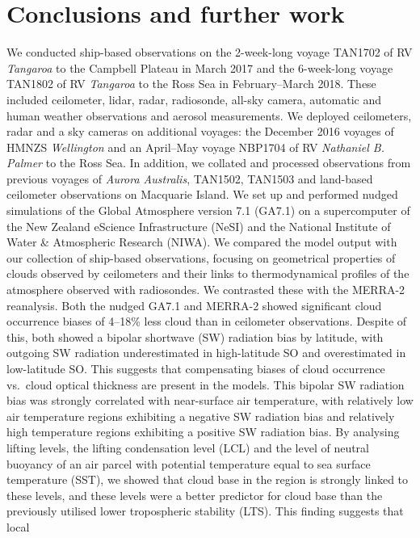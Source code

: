 \chapter{Conclusions and further work}

We conducted ship-based observations on the 2-week-long voyage TAN1702 of
RV \textit{Tangaroa} to the Campbell Plateau
in March 2017 and the 6-week-long voyage TAN1802 of RV \textit{Tangaroa} to the Ross Sea
in February--March 2018. These included ceilometer, lidar, radar, radiosonde,
all-sky camera, automatic and human weather observations and aerosol measurements.
We deployed ceilometers, radar and a sky cameras on additional voyages:
the December 2016 voyages of HMNZS \textit{Wellington} and an 
April--May voyage NBP1704 of RV \textit{Nathaniel B. Palmer} to the Ross Sea.
In addition, we collated and processed observations from previous voyages
of \textit{Aurora Australis}, TAN1502, TAN1503 and land-based ceilometer
observations on Macquarie Island.
We set up and performed nudged simulations
of the Global Atmosphere version 7.1 (GA7.1) on a supercomputer of the New Zealand eScience Infrastructure (NeSI) and the National Institute of Water \& Atmospheric Research (NIWA).
We compared the model output with our collection of ship-based observations,
focusing on geometrical properties of clouds observed by ceilometers and their
links to thermodynamical profiles of the atmosphere observed with radiosondes.
We contrasted these with the MERRA-2 reanalysis. Both the nudged GA7.1 and MERRA-2
showed significant cloud occurrence biases of 4--18\% less cloud than in
ceilometer observations. Despite of this, both showed a bipolar shortwave (SW)
radiation
bias by latitude, with outgoing SW radiation underestimated in high-latitude
SO and overestimated in low-latitude SO. This suggests that compensating biases
of cloud occurrence vs.~cloud optical thickness are present in the models.
This bipolar SW radiation bias was strongly correlated with near-surface air temperature,
with relatively low air temperature regions exhibiting a negative SW radiation bias and
relatively high temperature regions exhibiting a positive SW radiation bias. By analysing
lifting levels, the lifting condensation level (LCL) and the level of neutral buoyancy
of an air parcel with potential temperature equal to sea surface temperature (SST),
we showed that cloud base in the region is strongly linked to these levels,
and these levels were a better predictor for cloud base than the previously
utilised lower tropospheric stability (LTS). This finding suggests that local

